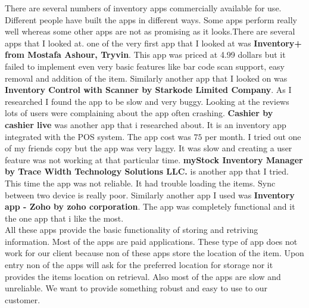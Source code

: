 There are several numbers of inventory apps commercially available for use. Different people have built the apps in different ways. Some apps perform really well whereas some other apps are not as promising as it looks.There are several apps that I looked at. one of the very first app that I looked at was \textbf{Inventory+ from Mostafa Ashour, Tryvin}. This app was priced at 4.99 dollars but it failed to implement even very basic features like bar code scan support, easy removal and addition of the item. Similarly another app that I looked on was \textbf{Inventory Control with Scanner by Starkode Limited Company}. As I researched I found the app to be slow and very buggy. Looking at the reviews lots of users were complaining about the app often crashing.\textbf{ Cashier by cashier live} was another app that i researched about. It is an inventory app integrated with the POS system. The app cost was $75$ per month. I tried out one of my friends copy but the app was very laggy. It was slow and creating a user feature was not working at that particular time. \textbf{myStock Inventory Manager by Trace Width Technology Solutions LLC.} is another app that I tried. This time the app was not reliable. It had trouble loading the items. Sync between two device is really poor. Similarly another app I used was \textbf{Inventory app - Zoho by zoho corporation}. The app was completely functional and it the one app that i like the most. \\
All these apps provide the basic functionality of storing and retriving information. Most of the apps are paid applications. These type of app does not work for our client because non of these apps store the location of the item. Upon entry non of the apps will ask for the preferred location for storage nor it provides the items location on retrieval. Also most of the apps are slow and unreliable. We want to provide something robust and easy to use to our customer.